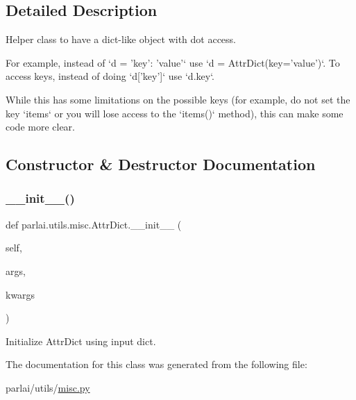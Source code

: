 \subsection{Detailed Description}
\begin{DoxyVerb}Helper class to have a dict-like object with dot access.

For example, instead of `d = {'key': 'value'}` use
`d = AttrDict(key='value')`.
To access keys, instead of doing `d['key']` use `d.key`.

While this has some limitations on the possible keys (for example, do not
set the key `items` or you will lose access to the `items()` method), this
can make some code more clear.
\end{DoxyVerb}
 

\subsection{Constructor \& Destructor Documentation}
\mbox{\label{classparlai_1_1utils_1_1misc_1_1AttrDict_a8a0ed33202adee184fc7ec06cf89a7ba}} 
\subsubsection{\texorpdfstring{\+\_\+\+\_\+init\+\_\+\+\_\+()}{\_\_init\_\_()}}
{\footnotesize\ttfamily def parlai.\+utils.\+misc.\+Attr\+Dict.\+\_\+\+\_\+init\+\_\+\+\_\+ (\begin{DoxyParamCaption}\item[{}]{self,  }\item[{}]{args,  }\item[{}]{kwargs }\end{DoxyParamCaption})}

\begin{DoxyVerb}Initialize AttrDict using input dict.
\end{DoxyVerb}
 

The documentation for this class was generated from the following file\+:\begin{DoxyCompactItemize}
\item 
parlai/utils/\hyperlink{misc_8py}{misc.\+py}\end{DoxyCompactItemize}
